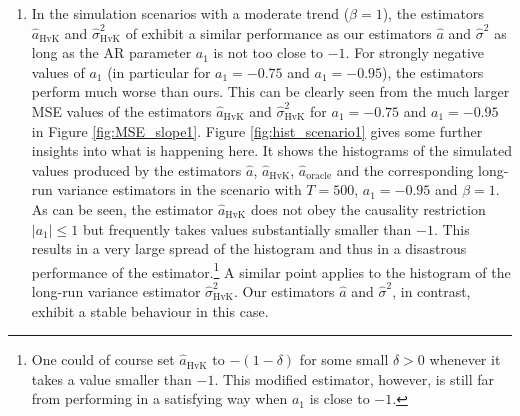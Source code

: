 \begin{enumerate}[label=(\roman*),leftmargin=0.9cm]


\item In the simulation scenarios with a moderate trend ($\beta = 1$), the estimators $\widehat{a}_{\text{HvK}}$ and $\widehat{\sigma}^2_{\text{HvK}}$ of \cite{Hall2003} exhibit a similar performance as our estimators $\widehat{a}$ and $\widehat{\sigma}^2$ as long as the AR parameter $a_1$ is not too close to $-1$. For strongly negative values of $a_1$ (in particular for $a_1 = -0.75$ and $a_1 = -0.95$), the estimators perform much worse than ours. This can be clearly seen from the much larger MSE values of the estimators  $\widehat{a}_{\text{HvK}}$ and $\widehat{\sigma}^2_{\text{HvK}}$ for $a_1 = -0.75$ and $a_1 = -0.95$ in Figure \ref{fig:MSE_slope1}. Figure \ref{fig:hist_scenario1} gives some further insights into what is happening here. It shows the histograms of the simulated values produced by the estimators $\widehat{a}$, $\widehat{a}_{\text{HvK}}$, $\widehat{a}_{\text{oracle}}$ and the corresponding long-run variance estimators in the scenario with $T=500$, $a_1=-0.95$ and $\beta = 1$. As can be seen, the estimator $\widehat{a}_{\text{HvK}}$ does not obey the causality restriction $|a_1| \le 1$ but frequently takes values substantially smaller than $-1$. This results in a very large spread of the histogram and thus in a disastrous performance of the estimator.\footnote{One could of course set $\widehat{a}_{\text{HvK}}$ to $-(1 - \delta)$ for some small $\delta > 0$ whenever it takes a value smaller than $-1$. This modified estimator, however, is still far from performing in a satisfying way when $a_1$ is close to $-1$.} A similar point applies to the histogram of the long-run variance estimator $\widehat{\sigma}^2_{\text{HvK}}$. Our estimators $\widehat{a}$ and $\widehat{\sigma}^2$, in contrast, exhibit a stable behaviour in this case. \\ %

\end{enumerate}
